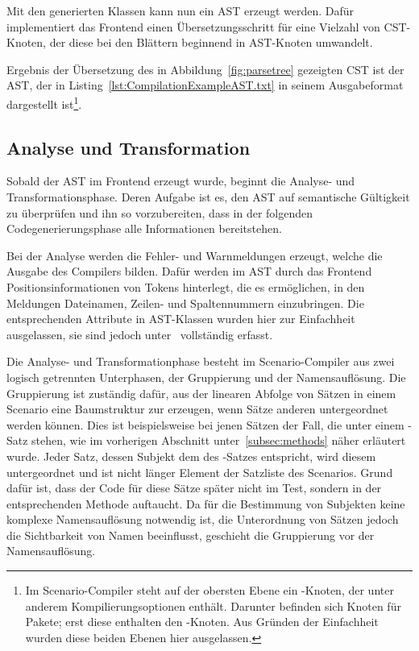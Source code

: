 Mit den generierten Klassen kann nun ein AST erzeugt werden.
Dafür implementiert das Frontend einen Übersetzungsschritt für eine Vielzahl von CST-Knoten, der diese bei den Blättern beginnend in AST-Knoten umwandelt.

Ergebnis der Übersetzung des in Abbildung~\ref{fig:parsetree} gezeigten CST ist der AST, der in Listing~\ref{lst:CompilationExampleAST.txt} in seinem Ausgabeformat dargestellt ist\footnote{
    Im Scenario-Compiler steht auf der obersten Ebene ein -Knoten, der unter anderem Kompilierungsoptionen enthält.
    Darunter befinden sich Knoten für Pakete;
    erst diese enthalten den -Knoten.
    Aus Gründen der Einfachheit wurden diese beiden Ebenen hier ausgelassen.
}.


\subsection{Analyse und Transformation}\label{subsec:data-model-gentreesrc}

Sobald der AST im Frontend erzeugt wurde, beginnt die Analyse- und Transformationsphase.
Deren Aufgabe ist es, den AST auf semantische Gültigkeit zu überprüfen und ihn so vorzubereiten, dass in der folgenden Codegenerierungsphase alle Informationen bereitstehen.

Bei der Analyse werden die Fehler- und Warnmeldungen erzeugt, welche die Ausgabe des Compilers bilden.
Dafür werden im AST durch das Frontend Positionsinformationen von Tokens hinterlegt, die es ermöglichen, in den Meldungen Dateinamen, Zeilen- und Spaltennummern einzubringen.
Die entsprechenden Attribute in AST-Klassen wurden hier zur Einfachheit ausgelassen, sie sind jedoch unter~\cite{gts-definitions} vollständig erfasst.

Die Analyse- und Transformationphase besteht im Scenario-Compiler aus zwei logisch getrennten Unterphasen, der Gruppierung und der Namensauflösung.
Die Gruppierung ist zuständig dafür, aus der linearen Abfolge von Sätzen in einem Scenario eine Baumstruktur zur erzeugen, wenn Sätze anderen untergeordnet werden können.
Dies ist beispielsweise bei jenen Sätzen der Fall, die unter einem -Satz stehen, wie im vorherigen Abschnitt unter~\ref{subsec:methods} näher erläutert wurde.
Jeder Satz, dessen Subjekt dem des -Satzes entspricht, wird diesem untergeordnet und ist nicht länger Element der Satzliste des Scenarios.
Grund dafür ist, dass der Code für diese Sätze später nicht im Test, sondern in der entsprechenden Methode auftaucht.
Da für die Bestimmung von Subjekten keine komplexe Namensauflösung notwendig ist, die Unterordnung von Sätzen jedoch die Sichtbarkeit von Namen beeinflusst, geschieht die Gruppierung vor der Namensauflösung.

